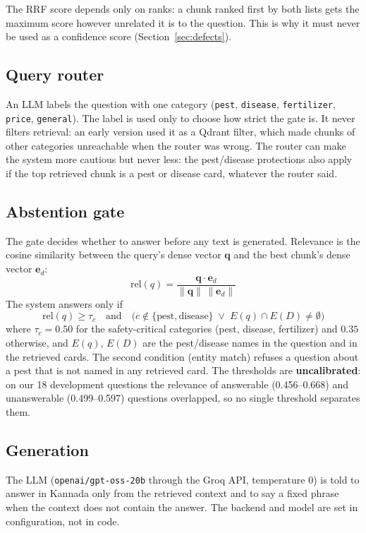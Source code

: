 The RRF score depends only on ranks: a chunk ranked first by both lists gets the maximum
score however unrelated it is to the question. This is why it must never be used as a
confidence score (Section~\ref{sec:defects}).

\subsection{Query router}
An LLM labels the question with one category (\texttt{pest}, \texttt{disease},
\texttt{fertilizer}, \texttt{price}, \texttt{general}). The label is used only to choose
how strict the gate is. It never filters retrieval: an early version used it as a Qdrant
filter, which made chunks of other categories unreachable when the router was wrong. The
router can make the system more cautious but never less: the pest/disease protections also
apply if the top retrieved chunk is a pest or disease card, whatever the router said.

\subsection{Abstention gate}
The gate decides whether to answer before any text is generated. Relevance is the cosine
similarity between the query's dense vector $\mathbf{q}$ and the best chunk's dense vector
$\mathbf{e}_d$:
\begin{equation}
  \mathrm{rel}(q) = \frac{\mathbf{q}\cdot\mathbf{e}_d}{\lVert\mathbf{q}\rVert\,\lVert\mathbf{e}_d\rVert}
\end{equation}
The system answers only if
\begin{equation}
  \mathrm{rel}(q) \ge \tau_c
  \quad\text{and}\quad
  \bigl(c\notin\{\text{pest},\text{disease}\} \;\lor\; E(q)\cap E(D)\neq\emptyset\bigr)
\end{equation}
where $\tau_c=0.50$ for the safety-critical categories (pest, disease, fertilizer) and
$0.35$ otherwise, and $E(q)$, $E(D)$ are the pest/disease names in the question and in the
retrieved cards. The second condition (entity match) refuses a question about a pest that
is not named in any retrieved card. The thresholds are \textbf{uncalibrated}: on our 18
development questions the relevance of answerable (0.456--0.668) and unanswerable
(0.499--0.597) questions overlapped, so no single threshold separates them.

\subsection{Generation}
The LLM (\texttt{openai/gpt-oss-20b} through the Groq API, temperature 0) is told to answer
in Kannada only from the retrieved context and to say a fixed phrase when the context does
not contain the answer. The backend and model are set in configuration, not in code.

